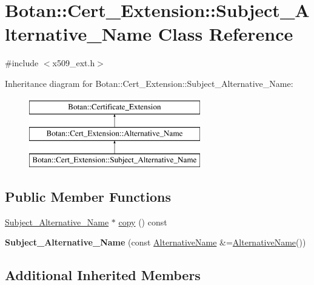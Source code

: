 \hypertarget{classBotan_1_1Cert__Extension_1_1Subject__Alternative__Name}{\section{Botan\-:\-:Cert\-\_\-\-Extension\-:\-:Subject\-\_\-\-Alternative\-\_\-\-Name Class Reference}
\label{classBotan_1_1Cert__Extension_1_1Subject__Alternative__Name}
}


{\ttfamily \#include $<$x509\-\_\-ext.\-h$>$}

Inheritance diagram for Botan\-:\-:Cert\-\_\-\-Extension\-:\-:Subject\-\_\-\-Alternative\-\_\-\-Name\-:\begin{figure}[H]
\begin{center}
\leavevmode
\includegraphics[height=3.000000cm]{classBotan_1_1Cert__Extension_1_1Subject__Alternative__Name}
\end{center}
\end{figure}
\subsection*{Public Member Functions}
\begin{DoxyCompactItemize}
\item 
\hyperlink{classBotan_1_1Cert__Extension_1_1Subject__Alternative__Name}{Subject\-\_\-\-Alternative\-\_\-\-Name} $\ast$ \hyperlink{classBotan_1_1Cert__Extension_1_1Subject__Alternative__Name_abbcfc0ad728c305dd2238c18cb629eeb}{copy} () const 
\item 
\hypertarget{classBotan_1_1Cert__Extension_1_1Subject__Alternative__Name_aaf8bc2b338e267ef64e3cf5f348a6061}{{\bfseries Subject\-\_\-\-Alternative\-\_\-\-Name} (const \hyperlink{classBotan_1_1AlternativeName}{Alternative\-Name} \&=\hyperlink{classBotan_1_1AlternativeName}{Alternative\-Name}())}\label{classBotan_1_1Cert__Extension_1_1Subject__Alternative__Name_aaf8bc2b338e267ef64e3cf5f348a6061}

\end{DoxyCompactItemize}
\subsection*{Additional Inherited Members}


